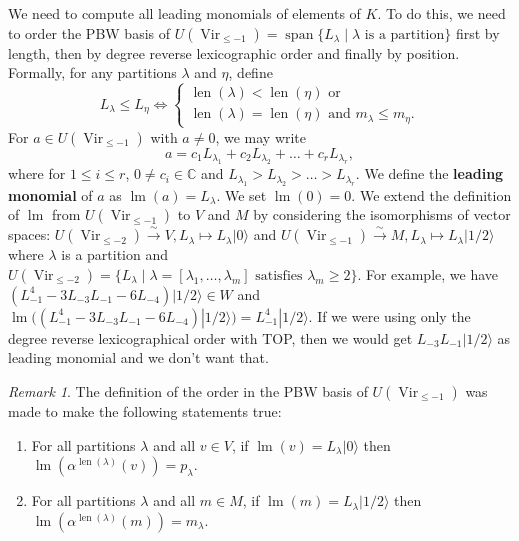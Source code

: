 \documentclass[12pt, reqno]{amsart}
\theoremstyle{remark}
\newtheorem{remark}[theorem]{Remark}
\DeclareMathOperator{\Vir}{Vir}
\DeclareMathOperator{\lm}{lm}
\DeclareMathOperator{\vspan}{span}
\DeclareMathOperator{\len}{len}
\newcommand{\vac}{|0\rangle}
\newcommand{\vachalf}{|1/2\rangle}
\begin{document}
We need to compute all leading monomials of elements of $K$.
To do this, we need to order the PBW basis of $U(\Vir_{\le -1}) = \vspan\{L_\lambda \mid \lambda\text{ is a partition}\}$ first by length, then by degree reverse lexicographic order and finally by position.
Formally, for any partitions $\lambda$ and $\eta$, define
\begin{equation*}
  L_\lambda \le L_\eta \iff
  \begin{cases}
    \len(\lambda) < \len(\eta)\text{ or } \\
    \len(\lambda) = \len(\eta)\text{ and }m_\lambda \le m_\eta.
  \end{cases}
\end{equation*}
For $a \in U(\Vir_{\le -1})$ with $a \neq 0$, we may write
\begin{equation*}
  a = c_1L_{\lambda_1} + c_2L_{\lambda_2} + \dots + c_rL_{\lambda_r},
\end{equation*}
where for $1 \le i\le r$, $0 \neq c_i \in \mathbb{C}$ and $L_{\lambda_1} > L_{\lambda_2} > \dots > L_{\lambda_r}$.
We define the \textbf{leading monomial} of $a$ as $\lm(a) = L_\lambda$. 
We set $\lm(0) = 0$.
We extend the definition of $\lm$ from $U(\Vir_{\le -1})$ to $V$ and $M$ by considering the isomorphisms of vector spaces: $U(\Vir_{\le -2}) \xrightarrow{\sim} V, L_\lambda \mapsto L_\lambda\vac$ and $U(\Vir_{\le -1}) \xrightarrow{\sim} M, L_\lambda \mapsto L_\lambda\vachalf$ where $\lambda$ is a partition and $U(\Vir_{\le -2}) = \{L_\lambda \mid \lambda = [\lambda_1, \dots, \lambda_m]\text{ satisfies }\lambda_m \ge 2\}$.
For example, we have $(L_{-1}^4 - 3L_{-3}L_{-1} - 6L_{-4})\vachalf \in W$ and $\lm((L_{-1}^4 - 3L_{-3}L_{-1} - 6L_{-4})\vachalf) = L_{-1}^4\vachalf$.
If we were using only the degree reverse lexicographical order with TOP, then we would get $L_{-3}L_{-1}\vachalf$ as leading monomial and we don't want that.

\begin{remark}
  \label{rmk:4}
  The definition of the order in the PBW basis of $U(\Vir_{\le -1})$ was made to make the following statements true:
  \begin{enumerate}[label={(\alph*)}]
  \item For all partitions $\lambda$ and all $v \in V$, if $\lm(v) = L_\lambda\vac$ then $\lm(\alpha^{\len(\lambda)}(v)) = p_\lambda$.
  \item For all partitions $\lambda$ and all $m \in M$, if $\lm(m) = L_\lambda\vachalf$ then $\lm(\alpha^{\len(\lambda)}(m)) = m_\lambda$.
  \end{enumerate}
\end{remark}
\end{document}

